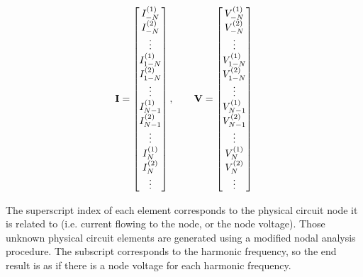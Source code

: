 \documentclass[12pt,journal,compsoc]{../ieeepaper/IEEEtran}
\begin{document}
\begin{equation}\label{eqn:ece1254projectReport:580}
\BI = 
\begin{bmatrix}
I^{(1)}_{-N} \\
I^{(2)}_{-N} \\
\vdots \\
I^{(1)}_{1-N} \\
I^{(2)}_{1-N} \\
\vdots \\
I^{(1)}_{N-1} \\
I^{(2)}_{N-1} \\
\vdots \\
I^{(1)}_{N} \\
I^{(2)}_{N} \\
\vdots \\
\end{bmatrix},
\qquad \BV = 
\begin{bmatrix}
V^{(1)}_{-N} \\
V^{(2)}_{-N} \\
\vdots \\
V^{(1)}_{1-N} \\
V^{(2)}_{1-N} \\
\vdots \\
V^{(1)}_{N-1} \\
V^{(2)}_{N-1} \\
\vdots \\
V^{(1)}_{N} \\
V^{(2)}_{N} \\
\vdots \\
\end{bmatrix}
\end{equation}

The superscript index of each element corresponds to the physical circuit node it is related to (i.e.
current flowing to the node, or the node voltage).  
Those unknown physical circuit elements are generated using a modified nodal analysis procedure.
The subscript corresponds to the harmonic frequency, so the end result is as if there is a 
node voltage for each harmonic frequency.
\end{document}

